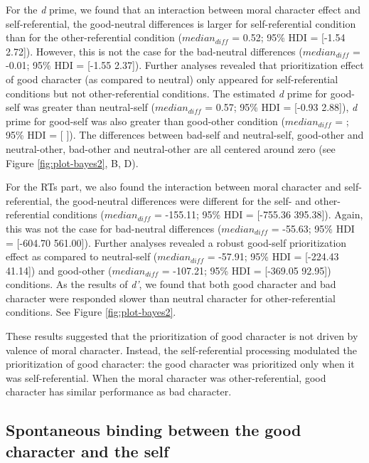 \documentclass[
  man]{apa6}
\begin{document}
For the \emph{d} prime, we found that an interaction between moral character effect and self-referential, the good-neutral differences is larger for self-referential condition than for the other-referential condition (\(median_{diff}\) = 0.52; 95\% HDI = {[}-1.54 2.72{]}). However, this is not the case for the bad-neutral differences (\(median_{diff}\) = -0.01; 95\% HDI = {[}-1.55 2.37{]}). Further analyses revealed that prioritization effect of good character (as compared to neutral) only appeared for self-referential conditions but not other-referential conditions. The estimated \emph{d} prime for good-self was greater than neutral-self (\(median_{diff}\) = 0.57; 95\% HDI = {[}-0.93 2.88{]}), \emph{d} prime for good-self was also greater than good-other condition (\(median_{diff}\) = ; 95\% HDI = {[} {]}). The differences between bad-self and neutral-self, good-other and neutral-other, bad-other and neutral-other are all centered around zero (see Figure \ref{fig:plot-bayes2}, B, D).

For the RTs part, we also found the interaction between moral character and self-referential, the good-neutral differences were different for the self- and other-referential conditions (\(median_{diff}\) = -155.11; 95\% HDI = {[}-755.36 395.38{]}). Again, this was not the case for bad-neutral differences (\(median_{diff}\) = -55.63; 95\% HDI = {[}-604.70 561.00{]}). Further analyses revealed a robust good-self prioritization effect as compared to neutral-self (\(median_{diff}\) = -57.91; 95\% HDI = {[}-224.43 41.14{]}) and good-other (\(median_{diff}\) = -107.21; 95\% HDI = {[}-369.05 92.95{]}) conditions. As the results of \emph{d'}, we found that both good character and bad character were responded slower than neutral character for other-referential conditions. See Figure \ref{fig:plot-bayes2}.

These results suggested that the prioritization of good character is not driven by valence of moral character. Instead, the self-referential processing modulated the prioritization of good character: the good character was prioritized only when it was self-referential. When the moral character was other-referential, good character has similar performance as bad character.

\hypertarget{spontaneous-binding-between-the-good-character-and-the-self}{%
\subsection{Spontaneous binding between the good character and the self}\label{spontaneous-binding-between-the-good-character-and-the-self}}
\end{document}
